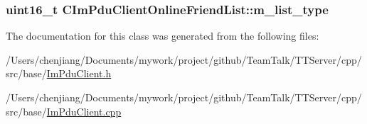 \subsubsection[{m\+\_\+list\+\_\+type}]{\setlength{\rightskip}{0pt plus 5cm}uint16\+\_\+t C\+Im\+Pdu\+Client\+Online\+Friend\+List\+::m\+\_\+list\+\_\+type\hspace{0.3cm}{\ttfamily [private]}}\label{class_c_im_pdu_client_online_friend_list_a5940a5533a7909c2af4b0490033e2577}


The documentation for this class was generated from the following files\+:\begin{DoxyCompactItemize}
\item 
/\+Users/chenjiang/\+Documents/mywork/project/github/\+Team\+Talk/\+T\+T\+Server/cpp/src/base/\hyperlink{_im_pdu_client_8h}{Im\+Pdu\+Client.\+h}\item 
/\+Users/chenjiang/\+Documents/mywork/project/github/\+Team\+Talk/\+T\+T\+Server/cpp/src/base/\hyperlink{_im_pdu_client_8cpp}{Im\+Pdu\+Client.\+cpp}\end{DoxyCompactItemize}
